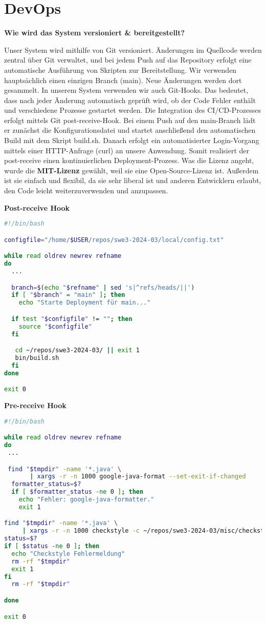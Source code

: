 \section*{DevOps}

\textbf{Wie wird das System versioniert & bereitgestellt?}

Unser System wird mithilfe von Git versioniert. Änderungen im Quellcode werden zentral über Git verwaltet, und bei jedem Push auf das Repository erfolgt eine automatische Ausführung von Skripten zur Bereitstellung. Wir verwenden hauptsächlich einen einzigen Branch (main). Neue Änderungen werden dort gesammelt.
In unserem System verwenden wir auch Git-Hooks. Das bedeutet, dass nach jeder Änderung automatisch geprüft wird, 
ob der Code Fehler enthält und verschiedene Prozesse gestartet werden. 
Die Integration des CI/CD-Prozesses erfolgt mittels Git post-receive-Hook. Bei einem Push auf den main-Branch lädt er zunächst die Konfigurationsdatei und startet anschließend den automatischen Build mit dem Skript build.sh. Danach erfolgt ein automatisierter Login-Vorgang mittels einer HTTP-Anfrage (curl) an unsere Anwendung. Somit realisiert der post-receive einen kontinuierlichen Deployment-Prozess.
Was die Lizenz angeht, wurde die \textbf{MIT-Lizenz} gewählt, weil sie eine Open-Source-Lizenz ist. Außerdem ist sie einfach und flexibil, da sie sehr liberal ist und anderen Entwicklern erlaubt, den Code leicht weiterzuverwenden und anzupassen.

\textbf{Post-receive Hook}
\begin{lstlisting}[language=bash]
#!/bin/bash

configfile="/home/$USER/repos/swe3-2024-03/local/config.txt"

while read oldrev newrev refname
do
  ...

  branch=$(echo "$refname" | sed 's|^refs/heads/||')
  if [ "$branch" = "main" ]; then
    echo "Starte Deployment für main..."

  if test "$configfile" != ""; then
    source "$configfile"
  fi

   cd ~/repos/swe3-2024-03/ || exit 1
   bin/build.sh
  fi
done

exit 0
\end{lstlisting}

\textbf{Pre-receive Hook}
\begin{lstlisting}[language=bash]
#!/bin/bash

while read oldrev newrev refname
do
 ... 

 find "$tmpdir" -name '*.java' \
       | xargs -r -n 1000 google-java-format --set-exit-if-changed
  formatter_status=$?
  if [ $formatter_status -ne 0 ]; then
    echo "Fehler: google-java-formatter."
    exit 1

find "$tmpdir" -name '*.java' \
     | xargs -r -n 1000 checkstyle -c ~/repos/swe3-2024-03/misc/checkstyle.xml
status=$?
if [ $status -ne 0 ]; then
  echo "Checkstyle Fehlermeldung"
  rm -rf "$tmpdir"
  exit 1
fi
  rm -rf "$tmpdir"

done

exit 0
\end{lstlisting}

